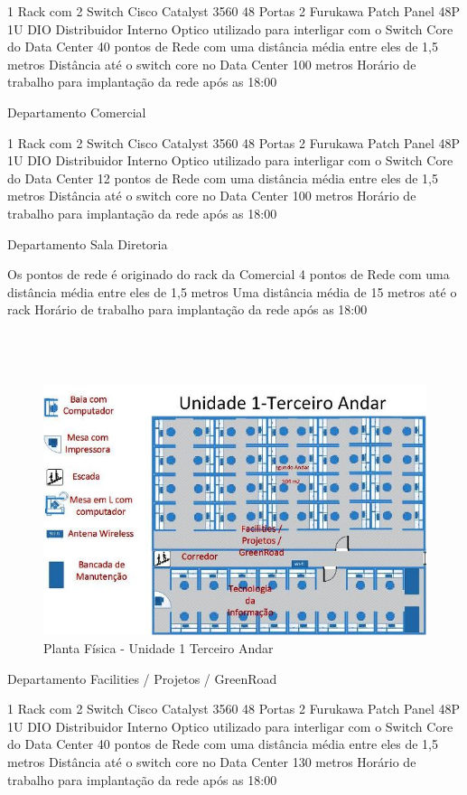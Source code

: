 \documentclass[	DIV=calc,%
							paper=a4,%
							fontsize=12pt,%
							onecolumn]{scrartcl}	 					%
\begin{document}
1 Rack com 2 Switch Cisco Catalyst 3560 48 Portas
2 Furukawa Patch Panel 48P 1U
DIO Distribuidor Interno Optico utilizado para interligar com o Switch Core do Data Center
40 pontos de Rede com uma distância média entre eles de 1,5 metros
Distância até o switch core no Data Center 100 metros
Horário de trabalho para implantação da rede após as 18:00

Departamento Comercial

1 Rack com 2 Switch Cisco Catalyst 3560 48 Portas 
2 Furukawa Patch Panel 48P 1U
DIO Distribuidor Interno Optico utilizado para interligar com o Switch Core do Data Center
12 pontos de Rede com uma distância média entre eles de 1,5 metros
Distância até o switch core no Data Center 100 metros
Horário de trabalho para implantação da rede após as 18:00

Departamento Sala Diretoria

Os pontos de rede é originado do rack da Comercial
4 pontos de Rede com uma distância média entre eles de 1,5 metros
Uma distância média de 15 metros até o rack
Horário de trabalho para implantação da rede após as 18:00
\\
\\
\\
\\
\begin{figure}
	\centering
	\includegraphics[]{fig5}
	\caption{Planta Física - Unidade 1 Terceiro Andar}
	\label{fig5}
\end{figure}

Departamento Facilities / Projetos / GreenRoad

1 Rack com 2 Switch Cisco Catalyst 3560 48 Portas
2 Furukawa Patch Panel 48P 1U
DIO Distribuidor Interno Optico utilizado para interligar com o Switch Core do Data Center
40 pontos de Rede com uma distância média entre eles de 1,5 metros
Distância até o switch core no Data Center 130 metros
Horário de trabalho para implantação da rede após as 18:00
\end{document}
